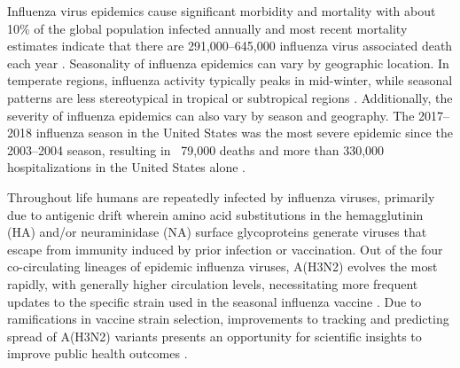 Influenza virus epidemics cause significant morbidity and mortality with about 10\% of the global population infected annually \citep{WHO_influenza_factsheet} and most recent mortality estimates indicate that there are 291,000--645,000 influenza virus associated death each year \citep{iuliano2018estimates}.
Seasonality of influenza epidemics can vary by geographic location.
In temperate regions, influenza activity typically peaks in mid-winter, while seasonal patterns are less stereotypical in tropical or subtropical regions \citep{petrova_evolution_2018}.
Additionally, the severity of influenza epidemics can also vary by season and geography.
The 2017--2018 influenza season in the United States was the most severe epidemic since the 2003--2004 season, resulting in ~79,000 deaths and more than 330,000 hospitalizations in the United States alone \citep{garten2018update}.

Throughout life humans are repeatedly infected by influenza viruses, primarily due to antigenic drift wherein amino acid substitutions in the hemagglutinin (HA) and/or neuraminidase (NA) surface glycoproteins generate viruses that escape from immunity induced by prior infection or vaccination.
Out of the four co-circulating lineages of epidemic influenza viruses, A(H3N2) evolves the most rapidly, with generally higher circulation levels, necessitating more frequent updates to the specific strain used in the seasonal influenza vaccine \citep{bedford_integrating_2014, hay2001evolution}.
Due to ramifications in vaccine strain selection, improvements to tracking and predicting spread of A(H3N2) variants presents an opportunity for scientific insights to improve public health outcomes \citep{morris_predictive_2017}.

